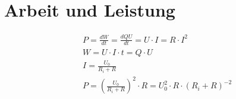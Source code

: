 \section{Arbeit und Leistung}

\begin{align*}
	& P = \frac{dW}{dt} = \frac{dQU}{dt} = U \cdot I = R \cdot I^2 \\
	& W = U \cdot I \cdot t = Q \cdot U \\
	& I = \frac{U_0}{R_i + R} \\
	& P = \left(\frac{U_0}{R_i + R}\right)^2 \cdot R = U_0^2 \cdot R \cdot (R_i + R)^{-2}
\end{align*}
